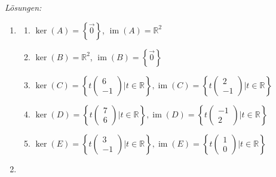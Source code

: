 \clearpage
\emph{Lösungen:}
\begin{enumerate}
  \item 
  \begin{enumerate}
    \item \( \ker(A) = \left\{ \vec{0} \right\} \), \( \operatorname{im}(A) = \mathbb{R}^2 \)
    \item \( \ker(B) = \mathbb{R}^2 \), \( \operatorname{im}(B) = \left\{ \vec{0} \right\} \)
    \item \( \ker(C) = \left\{ t\begin{pmatrix} 6 \\ -1 \end{pmatrix} | t\in\mathbb{R}  \right\}  ,  \operatorname{im}(C) =  \left\{ t\begin{pmatrix} 2 \\ -1  \end{pmatrix} | t\in\mathbb{R}  \right\}\)
    \item \( \ker(D) = \left\{ t\begin{pmatrix} 7 \\ 6 \end{pmatrix} | t\in\mathbb{R}  \right\}  ,  \operatorname{im}(D) =  \left\{ t\begin{pmatrix} -1 \\ 2  \end{pmatrix} | t\in\mathbb{R}  \right\}\)
    \item \( \ker(E) = \left\{ t\begin{pmatrix} 3 \\ -1 \end{pmatrix} | t\in\mathbb{R}  \right\}  ,  \operatorname{im}(E) =  \left\{ t\begin{pmatrix} 1 \\ 0  \end{pmatrix} | t\in\mathbb{R}  \right\}\)
    \end{enumerate}
    \item {}
\end{enumerate}
